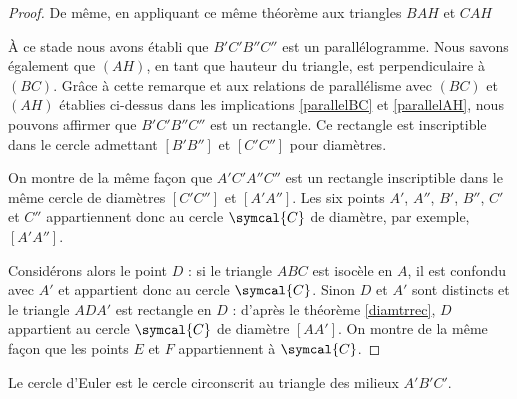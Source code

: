 \begin{proof}
De même, en appliquant ce même théorème aux triangles $BAH$ et $CAH$

À ce stade nous avons établi que $B'C'B''C''$ est un parallélogramme. Nous savons également que $(AH)$, en tant que hauteur du triangle, est perpendiculaire à $(BC)$. Grâce à cette remarque et aux relations de parallélisme avec $(BC)$ et $(AH)$ établies ci-dessus dans les implications \eqref{parallelBC} et \eqref{parallelAH}, nous pouvons affirmer que $B'C'B''C''$ est un rectangle. Ce rectangle est inscriptible dans le cercle  admettant $[B'B'']$ et $[C'C'']$ pour diamètres. 

On montre de la même façon que $A'C'A''C''$ est un rectangle inscriptible dans le même cercle  de diamètres $[C'C'']$ et $[A'A'']$. Les six points $A'$, $A''$, $B'$, $B''$, $C'$ et $C''$ appartiennent donc au cercle $\symcal{C}$ de diamètre, par exemple, $[A'A'']$.

Considérons alors le point $D$ : si le triangle $ABC$ est isocèle en $A$, il est confondu avec $A'$ et appartient donc au cercle $\symcal{C}$. Sinon $D$ et $A'$ sont distincts et le triangle $ADA'$ est rectangle en $D$ : d'après le théorème \ref{diamtrrec}, $D$ appartient au cercle $\symcal{C}$ de diamètre $[AA']$. On montre de la même façon que les points $E$ et $F$ appartiennent  à $\symcal{C}$.
\end{proof}
\begin{remark} Le cercle d'Euler est le cercle circonscrit au triangle des milieux $A'B'C'$.
\end{remark}
%
